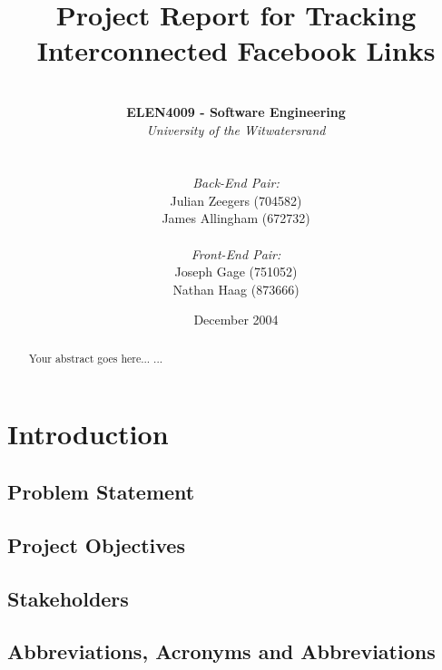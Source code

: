 \documentclass[12pt,onecolumn]{article}
\title{\vspace{-4.2cm} \huge Project Report for Tracking Interconnected Facebook Links }
\author{ \horrule{1pt} \\ \textbf{ELEN4009 - Software Engineering} \\ \emph{University of the Witwatersrand} \\ \horrule{1pt} \\\\ \emph{Back-End Pair:} \\ Julian Zeegers (704582) \\ James Allingham (672732) \\ \\ \emph{Front-End Pair:} \\ Joseph Gage (751052)\\ Nathan Haag (873666) \\ \horrule{1pt}}
\date{December 2004}
\begin{document}
\date{\vspace{-5ex}}
\maketitle
\pagestyle{plain}
\setcounter{page}{1}

\begin{abstract}
Your abstract goes here...
...
\end{abstract}

\newpage

\tableofcontents

\newpage

\section{Introduction}

	\subsection{Problem Statement} %

	\subsection{Project Objectives} %

	\subsection{Stakeholders} %

	\subsection{Abbreviations, Acronyms and Abbreviations} %
\end{document}
